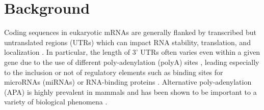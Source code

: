 \documentclass{bmcart}
\begin{document}
\begin{frontmatter}
\begin{abstractbox}
\begin{keyword}
\end{keyword}


\end{abstractbox}
%

\end{frontmatter}



\section*{Background}

Coding sequences in eukaryotic mRNAs are generally flanked by transcribed but untranslated regions (UTRs) which can impact RNA stability, translation, and localization \cite{Lewis1995TheMetabolism}. In particular, the length of 3' UTRs often varies even within a given gene due to the use of different poly-adenylation (polyA) sites \cite{Tian2016AlternativePrecursors}, leading especially to the inclusion or not of regulatory elements such as binding sites for microRNAs (miRNAs) or RNA-binding proteins \cite{Fabian2010RegulationMicroRNAs}. Alternative poly-adenylation (APA) is highly prevalent in mammals \cite{Derti2012AMammals} and has been shown to be important to a variety of biological phenomena \cite{Sandberg2008ProliferatingSites,Mayr2009WidespreadCells,Miura2013WidespreadBrain, Ha2018QAPA:Data}.
\end{document}
